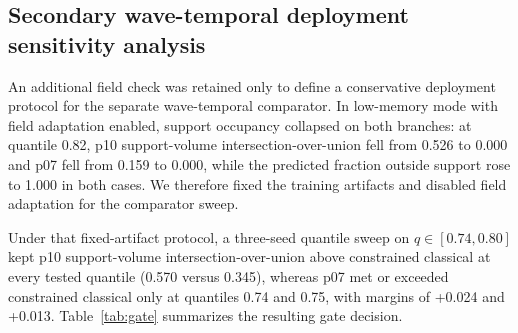 \documentclass[preprint,12pt]{elsarticle}
\begin{document}
\subsection{Secondary wave-temporal deployment sensitivity analysis}

An additional field check was retained only to define a conservative deployment protocol for the separate wave-temporal comparator. In low-memory mode with field adaptation enabled, support occupancy collapsed on both branches: at quantile 0.82, p10 support-volume intersection-over-union fell from 0.526 to 0.000 and p07 fell from 0.159 to 0.000, while the predicted fraction outside support rose to 1.000 in both cases. We therefore fixed the training artifacts and disabled field adaptation for the comparator sweep.

Under that fixed-artifact protocol, a three-seed quantile sweep on $q \in [0.74, 0.80]$ kept p10 support-volume intersection-over-union above constrained classical at every tested quantile (0.570 versus 0.345), whereas p07 met or exceeded constrained classical only at quantiles 0.74 and 0.75, with margins of +0.024 and +0.013. Table~\ref{tab:gate} summarizes the resulting gate decision.

\begin{table}[t]
\centering
\small
\caption{Cross-benchmark gate for wave-temporal deployment with fixed training artifacts and no field adaptation (three-seed means). Gate condition: p10 support-volume IoU $>$ constrained classical and p07 support-volume IoU $\geq$ constrained classical.}
\label{tab:gate}
\end{table}
\end{document}
